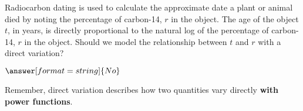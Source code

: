 \documentclass{ximera}
\begin{document}
\begin{question}
[Anthropology] Radiocarbon dating is used to calculate the approximate date a plant or animal died by noting the percentage of carbon-14, $r$ in the object. The age of the object $t$, in years, is directly proportional to the natural log of the percentage of carbon-14, $r$ in the object. Should we model the relationship between $t$ and $r$ with a direct variation?

$\answer[format=string]{No}$

\begin{feedback}
Remember, direct variation describes how two quantities vary directly \textbf{with power functions}. 
\end{feedback}


\end{question}
\end{document}

